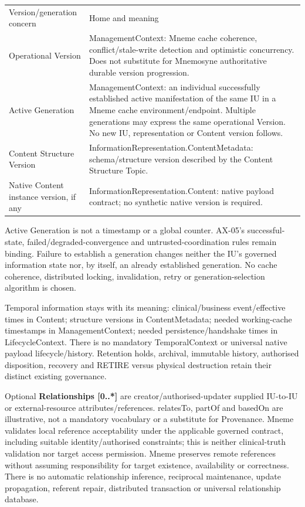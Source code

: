 \begin{longtable}{>{\raggedright\arraybackslash}p{}>{\raggedright\arraybackslash}p{}}
Version/generation concern & Home and meaning \\
Operational Version & ManagementContext: Mneme cache coherence, conflict/stale-write detection and optimistic concurrency. Does not substitute for Mnemosyne authoritative durable version progression. \\
Active Generation & ManagementContext: an individual successfully established active manifestation of the same IU in a Mneme cache environment/endpoint. Multiple generations may express the same operational Version. No new IU, representation or Content version follows. \\
Content Structure Version & InformationRepresentation.ContentMetadata: schema/structure version described by the Content Structure Topic. \\
Native Content instance version, if any & InformationRepresentation.Content: native payload contract; no synthetic native version is required. \\
\end{longtable}


Active Generation is not a timestamp or a global counter. AX-05's successful-state,
failed/degraded-convergence and untrusted-coordination rules remain binding.
Failure to establish a generation changes neither the IU's governed information
state nor, by itself, an already established generation. No cache coherence,
distributed locking, invalidation, retry or generation-selection algorithm is chosen.



Temporal information stays with its meaning: clinical/business event/effective
times in Content; structure versions in ContentMetadata; needed working-cache
timestamps in ManagementContext; needed persistence/handshake times in LifecycleContext.
There is no mandatory TemporalContext or universal native payload lifecycle/history.
Retention holds, archival, immutable history, authorised disposition, recovery and
RETIRE versus physical destruction retain their distinct existing governance.



Optional \textbf{Relationships [0..*]} are creator/authorised-updater supplied IU-to-IU
or external-resource attributes/references. relatesTo, partOf and basedOn are
illustrative, not a mandatory vocabulary or a substitute for Provenance. Mneme
validates local reference acceptability under the applicable governed contract,
including suitable identity/authorised constraints; this is neither clinical-truth
validation nor target access permission. Mneme preserves remote references without
assuming responsibility for target existence, availability or correctness. There
is no automatic relationship inference, reciprocal maintenance, update propagation,
referent repair, distributed transaction or universal relationship database.



